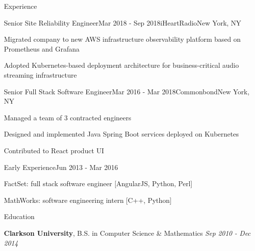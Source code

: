 \documentclass[
	10pt, %
]{resume} %
\begin{document}
\begin{rSection}{Experience}

    \begin{rSubsection}{Senior Site Reliability Engineer}{Mar 2018 - Sep 2018}{iHeartRadio}{New York, NY}
        \item Migrated company to new AWS infrastructure observability platform based on Prometheus and Grafana
        \item Adopted Kubernetes-based deployment architecture for business-critical audio streaming infrastructure
    \end{rSubsection}


    \begin{rSubsection}{Senior Full Stack Software Engineer}{Mar 2016 - Mar 2018}{Commonbond}{New York, NY}
        \item Managed a team of 3 contracted engineers
        \item Designed and implemented Java Spring Boot services deployed on Kubernetes
        \item Contributed to React product UI
    \end{rSubsection}
    

    \begin{rSubsection}{Early Experience}{Jun 2013 - Mar 2016}{}{}
        \item FactSet: full stack software engineer [AngularJS, Python, Perl]
        \item MathWorks: software engineering intern [C++, Python]
    \end{rSubsection}
    
\end{rSection}


\begin{rSection}{Education}

    \textbf{Clarkson University}, B.S. in Computer Science \& Mathematics \hfill \textit{Sep 2010 - Dec 2014} \\
	
\end{rSection}

\end{document}
